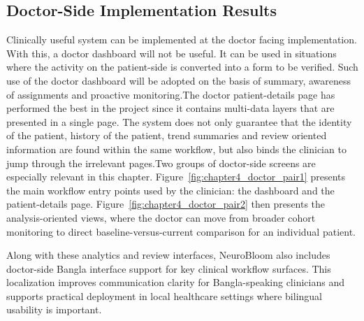 \documentclass[12pt,a4paper]{report}
\begin{document}
\subsection{Doctor-Side Implementation Results}
Clinically useful system can be implemented at the doctor facing implementation. With this, a doctor dashboard will not be useful. It can be used in situations where the activity on the patient-side is converted into a form to be verified. Such use of the doctor dashboard will be adopted on the basis of summary, awareness of assignments and proactive monitoring.The doctor patient-details page has performed the best in the project since it contains multi-data layers that are presented in a single page. The system does not only guarantee that the identity of the patient, history of the patient, trend summaries and review oriented information are found within the same workflow, but also binds the clinician to jump through the irrelevant pages.Two groups of doctor-side screens are especially relevant in this chapter. Figure~\ref{fig:chapter4_doctor_pair1} presents the main workflow entry points used by the clinician: the dashboard and the patient-details page. Figure~\ref{fig:chapter4_doctor_pair2} then presents the analysis-oriented views, where the doctor can move from broader cohort monitoring to direct baseline-versus-current comparison for an individual patient.

Along with these analytics and review interfaces, NeuroBloom also includes doctor-side Bangla interface support for key clinical workflow surfaces. This localization improves communication clarity for Bangla-speaking clinicians and supports practical deployment in local healthcare settings where bilingual usability is important.
\end{document}
